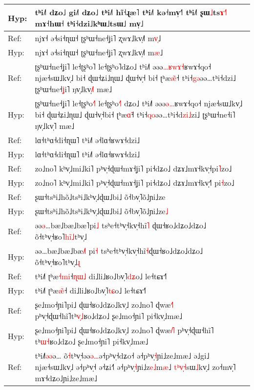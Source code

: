 \documentclass[10pt]{article}
\DeclareRobustCommand{\hl}[1]{{\textcolor{red}{#1}}}
\begin{document}
\begin{longtable}{ll}
Hyp: & tʰi˩˥ dʑo˩\hl{ }gi˩˥ dʑo˩ tʰi˩˥ hĩ˧ɻæ˥ tʰi˩˥ kə˧mv̩˧˥ tʰi˩˥ ʂɯ\hl{˩}ts\hl{ɤ}\hl{˧}˥ mɤ˧hɯ˧ tʰi˧dzi˩kʰɯ˩tsɯ˩ mv̩˩ \\ 
\midrule 
Ref: & njɤ˧ ə˧si˧ɳɯ˧ ʈʂʰɯ˧ne˧ʝi˥ ʐwɤ˩kv̩˩˥ m\hl{v}\hl{̩}˩ \\ 
Hyp: & njɤ˧ ə˧si˧ɳɯ˧ ʈʂʰɯ˧ne˧ʝi˥ ʐwɤ˩kv̩˩˥ m\hl{æ}˩ \\ 
\midrule 
Ref: & ʈʂʰɯ˧ne˧ʝi˥ le˧ʈʂʰo˥ le˧ʈʂʰo˥dʑo˩ tʰi˩˥ əəə\hl{…}\hl{ʁ}\hl{w}\hl{ɤ}\hl{˧}ʁwɤ˧qo˧ njæ˧sɯ˩kv̩˩ bi˧ ɖɯ˧ʑi˩ɳɯ˩ ɖɯ˧v̩˧\hl{ }bi˧ ʈʰæ\hl{æ}̃˧ tʰi˧\hl{g}\hl{ə}əə…tʰi˧dzi˩ ʈʂʰɯ˧ne˧\hl{ʝ}i˥ ŋv̩˩kv̩\hl{˩}˥ mæ˩ \\ 
Hyp: & ʈʂʰɯ˧ne˧ʝi˥ le˧ʈʂʰo\hl{˧}˥ le˧ʈʂʰo\hl{˧}˥\hl{ }dʑo˩ tʰi˩˥ əəə\hl{ə}\hl{…}ʁwɤ˧qo˧ njæ˧sɯ˩kv̩˩ bi˧ ɖɯ˧ʑi˩ɳɯ˩ ɖɯ˧v̩˧bi˧ ʈʰæ\hl{ɑ}̃˧ tʰi˧\hl{q}\hl{o}əə…tʰi˧d\hl{z}\hl{i}\hl{˩}zi˩ ʈʂʰɯ˧ne˧i˥ ŋv̩˩kv̩˥ mæ˩ \\ 
\midrule 
Ref: & lɑ˧tʰɑ˧di˧ɳɯ˥ tʰi˩˥ ə˧lɑ˧ʁwɤ˧dzi˩ \\ 
Hyp: & lɑ˧tʰɑ˧di˧ɳɯ˥ tʰi˩˥ ə˧lɑ˧ʁwɤ˧dzi˩ \\ 
\midrule 
Ref: & zo˩no˥ kʰv̩˩mi˩ki˥ pʰv̩˧ɖɯ˧mɤ˧ʝi˥ pi˧dʑo˩ dʑɤ˩mɤ˧kv̩˧pi\hl{˥}zo˩ \\ 
Hyp: & zo˩no˥ kʰv̩˩mi˩ki˥ pʰv̩˧ɖɯ˧mɤ˧ʝi˥ pi˧dʑo˩ dʑɤ˩mɤ˧kv̩˧\hl{˥}\hl{ }pi\hl{˧}zo˩ \\ 
\midrule 
Ref: & ʂɯ˧tsʰi˩hõ˩tsʰi˩kʰv̩˩ɖɯ˩bi˩ õ˧bv̩˥õ˩ɲi˩ze \\ 
Hyp: & ʂɯ˧tsʰi˩hõ˩tsʰi˩kʰv̩˩ɖɯ˩bi˩ õ˧bv̩˥õ˩ɲi˩ze\hl{˩} \\ 
\midrule 
Ref: & əə\hl{ə}…bæ˩bæ˩bæ˥pi\hl{˩} tsʰe˧tʰv̩˧kv̩˧hĩ\hl{˥}\hl{ }ɖɯ˧ʁo˩dʑo˩dʑo˩ õ˧tʰv̩˧ʁo˥\hl{h}\hl{i}\hl{̃}\hl{˩}tʰv̩˩ \\ 
Hyp: & əə…bæ˩bæ˩bæ\hl{˩}˥\hl{ }pi\hl{˧} tsʰe˧tʰv̩˧kv̩˧hĩ\hl{˧}ɖɯ˧ʁo˩dʑo˩dʑo˩ õ˧tʰv̩˧ʁo˥tʰv̩˩\hl{ɻ} \\ 
\midrule 
Ref: & tʰi˩˥ ʈʰæ\hl{˧}\hl{m}\hl{i}˧\hl{ɳ}\hl{ɯ}\hl{˩} di˩li˩ʁo˩bv̩˥\hl{d}\hl{ʑ}o˩ le˧tɕɤ˧˥ \\ 
Hyp: & tʰi˩˥ ʈʰæ\hl{æ}\hl{̃}˧ di˩li˩ʁo˩bv̩˥\hl{t}\hl{ɕ}o˩ le˧tɕɤ˧˥ \\ 
\midrule 
Ref: & ʂe˩mo˧ɲi˥pi˩ ɖɯ˧ʁo˩dʑo˩kv̩˩ zo˩no˥ ɖwæ\hl{˧}˥ pʰv̩˧ɖɯ˧hĩ˥tʰ\hl{v}\hl{̩}\hl{˩}ʁo˩dʑo˩ ʂe˩mo˧ɲi˥ pi˧kv̩˩mæ˩ \\ 
Hyp: & ʂe˩mo˧ɲi˥pi˩ ɖɯ˧ʁo˩dʑo˩kv̩˩ zo˩no˥ ɖwæ\hl{˩}\hl{˥}˥ pʰv̩˧ɖɯ˧hĩ˥\hl{ }tʰ\hl{ɯ}\hl{˧}ʁo˩dʑo˩ ʂe˩mo˧ɲi˥ pi˧kv̩˩mæ˩ \\ 
\midrule 
Ref: & tʰi˩˥\hl{ə}\hl{ə}ə…\hl{ }o\hl{̃}\hl{˧}tʰv̩˧əə\hl{ə}\hl{…}ə˧pʰv̩˧dʑo˧ ə˧pʰv̩\hl{˧}ɲi˩ze˩mæ˩ ə˩gi˩ njæ˧sɯ˩kv̩˩ ə˧pʰv̩˧ ə˧ʑi˧˥ ə˧pʰv̩\hl{˧}ɲi˩z\hl{e}\hl{˩}m\hl{æ}˩\hl{ }\hl{t}\hl{ʰ}\hl{v}\hl{̩}\hl{˧}sɯ\hl{˩}kv̩˩ zo˧mv̩˥ mɤ˧dʑo˩ɲi˩ze˩mæ˩ \\ 

\end{longtable}
\end{document}
